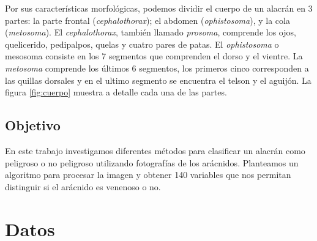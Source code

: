 \documentclass[a4paper, 10pt]{article}
\begin{document}
Por sus características morfológicas, podemos dividir el cuerpo de un alacrán en 3 partes: la parte frontal (\emph{cephalothorax}); el abdomen (\emph{ophistosoma}), y la cola (\emph{metosoma}). El \emph{cephalothorax}, también llamado \emph{prosoma}, comprende los ojos, quelicerido, pedipalpos, quelas y cuatro pares de patas. El \emph{ophistosoma} o mesosoma consiste en los 7 segmentos que comprenden el dorso y el vientre. La \emph{metosoma} comprende los últimos 6 segmentos, los primeros cinco corresponden a las quillas dorsales y en el ultimo segmento se encuentra el telson y el aguijón. La figura \ref{fig:cuerpo} muestra a detalle cada una de las partes.

\subsection{Objetivo}
En este trabajo investigamos diferentes métodos para clasificar un alacrán como peligroso o no peligroso utilizando fotografías de los arácnidos. Planteamos un algoritmo para procesar la imagen y obtener 140 variables que nos permitan distinguir si el arácnido es venenoso o no.

\section{Datos}
\end{document}
